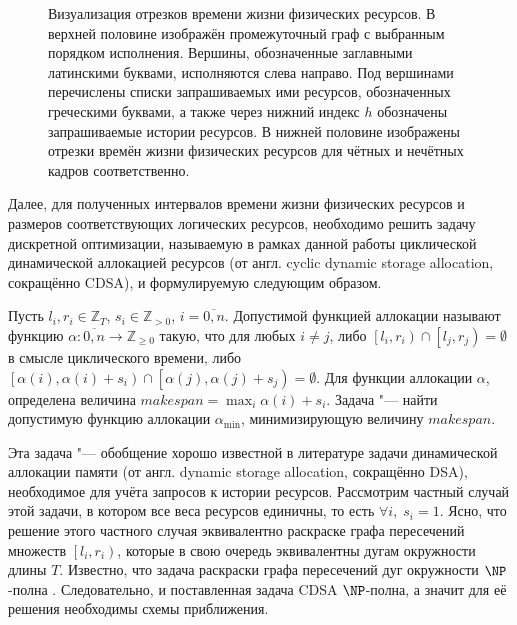 \begin{figure*}[ht]
\caption{Визуализация отрезков времени жизни физических ресурсов.
В верхней половине изображён промежуточный граф с выбранным порядком исполнения.
Вершины, обозначенные заглавными латинскими буквами, исполняются слева направо.
Под вершинами перечислены списки запрашиваемых ими ресурсов, обозначенных греческими буквами, а также через нижний индекс $h$ обозначены запрашиваемые истории ресурсов.
В нижней половине изображены отрезки времён жизни физических ресурсов для чётных и нечётных кадров соответственно.}
\label{fig:twoFrameLifetime}
\end{figure*}
Далее, для полученных интервалов времени жизни физических ресурсов и размеров соответствующих логических ресурсов, необходимо решить задачу дискретной оптимизации, называемую в рамках данной работы циклической динамической аллокацией ресурсов (от англ. cyclic dynamic storage allocation, сокращённо CDSA), и формулируемую следующим образом.

Пусть $l_i, r_i \in \mathbb{Z}_T$, $s_i \in \mathbb{Z}_{>0}$, $i=\overline{0,n}$.
Допустимой функцией аллокации называют функцию $\alpha : \overline{0,n} \to \mathbb{Z}_{\geqslant 0}$ такую, что для любых $i \neq j$, либо $\left[l_i, r_i\right) \cap \left[l_j, r_j\right) = \emptyset$ в смысле циклического времени, либо $\left[\alpha(i), \alpha(i) + s_i\right) \cap \left[\alpha(j), \alpha(j) + s_j\right) = \emptyset$.
Для функции аллокации $\alpha$, определена величина $makespan = \max_i \alpha(i) + s_i$.
Задача "--- найти допустимую функцию аллокации $\alpha_{\min}$, минимизирующую величину $makespan$.

Эта задача "--- обобщение хорошо известной в литературе задачи динамической аллокации памяти (от англ. dynamic storage allocation, сокращённо DSA), необходимое для учёта запросов к истории ресурсов.
Рассмотрим частный случай этой задачи, в котором все веса ресурсов единичны, то есть $\forall i,\;s_i = 1$.
Ясно, что решение этого частного случая эквивалентно раскраске графа пересечений множеств $\left[l_i, r_i\right)$, которые в свою очередь эквивалентны дугам окружности длины $T$.
Известно, что задача раскраски графа пересечений дуг окружности $\NP$-полна \cite{doi:10.1137/0601025}.
Следовательно, и поставленная задача CDSA $\NP$-полна, а значит для её решения необходимы схемы приближения.

